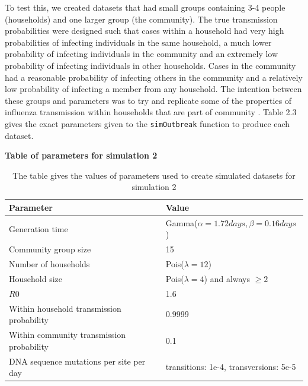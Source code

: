\documentclass[11pt,a4paper]{report}
\begin{document}
To test this, we created datasets that had small groups containing 3-4 people (households) and one larger group (the community). The true transmission probabilities were designed such that cases within a household had very high probabilities of infecting individuals in the same household, a much lower probability of infecting individuals in the community and an extremely low probability of infecting individuals in other households. Cases in the community had a reasonable probability of infecting others in the community and a relatively low probability of infecting a member from any household. The intention between these groups and parameters was to try and replicate some of the properties of influenza transmission within households that are part of community \citep{Cauchemez04}. Table 2.3 gives the exact parameters given to the {\tt simOutbreak} function to produce each dataset.
\begin{table}[h!]
\centering
{\bf Table of parameters for simulation 2}
\caption{The table gives the values of parameters used to create simulated datasets for simulation 2}
\begin{tabular}{|l|l|}
\hline
Parameter & Value \\
\hline
Generation time & Gamma($\alpha = 1.72 days	,\beta=0.16 days$) \\
\hline
Community group size & 15 \\
\hline
Number of households & Pois($\lambda=12$) \\
\hline
Household size & Pois($\lambda=4$) and always $\geq 2$ \\
\hline
$R0$ & 1.6 \\
\hline
Within household transmission probability & 0.9999 \\
\hline
Within community transmission probability & 0.1 \\
\hline
DNA sequence mutations per site per day & transitions: 1e-4, transversions: 5e-5 \\
\hline
\end{tabular}
\end{table}
\end{document}
